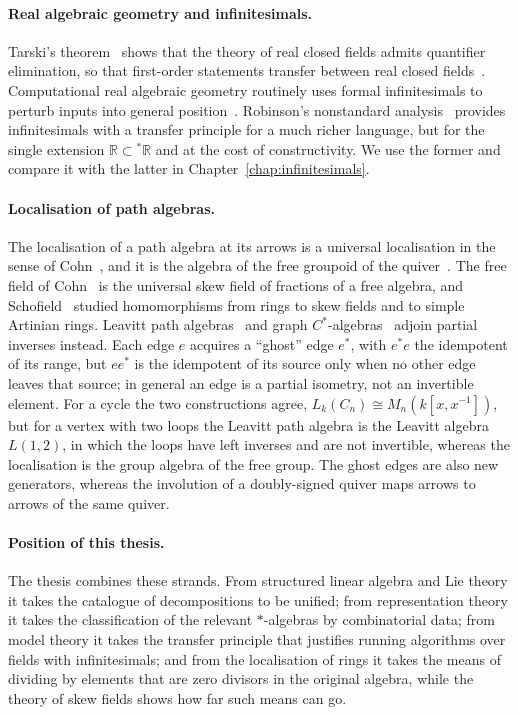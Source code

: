 \documentclass[12pt, a4paper]{report}
\theoremstyle{plain}
\theoremstyle{definition}
\theoremstyle{remark}
\theoremstyle{plain}
\newcommand{\RR}{\mathbb{R}}
\begin{document}
\paragraph{Real algebraic geometry and infinitesimals.}
Tarski's theorem~\cite{Tarski1951} shows that the theory of real closed fields admits quantifier elimination, so that first-order statements transfer between real closed fields~\cite{BochnakCosteRoy1998,Marker2002}. Computational real algebraic geometry routinely uses formal infinitesimals to perturb inputs into general position~\cite{BasuPollackRoy2006}. Robinson's nonstandard analysis~\cite{Robinson1966} provides infinitesimals with a transfer principle for a much richer language, but for the single extension $\RR\subset{}^*\RR$ and at the cost of constructivity. We use the former and compare it with the latter in Chapter~\ref{chap:infinitesimals}.

\paragraph{Localisation of path algebras.}
The localisation of a path algebra at its arrows is a universal localisation in the sense of Cohn~\cite{Cohn2006}, and it is the algebra of the free groupoid of the quiver~\cite{GabrielZisman1967}. The free field of Cohn~\cite{Cohn2006,CohnReutenauer1999} is the universal skew field of fractions of a free algebra, and Schofield~\cite{Schofield1985} studied homomorphisms from rings to skew fields and to simple Artinian rings. Leavitt path algebras~\cite{AbramsAraSilesMolina2017} and graph $C^*$-algebras~\cite{Raeburn2005} adjoin partial inverses instead. Each edge $e$ acquires a ``ghost'' edge $e^*$, with $e^*e$ the idempotent of its range, but $ee^*$ is the idempotent of its source only when no other edge leaves that source; in general an edge is a partial isometry, not an invertible element. For a cycle the two constructions agree, $L_k(C_n)\cong M_n(k[x,x^{-1}])$, but for a vertex with two loops the Leavitt path algebra is the Leavitt algebra $L(1,2)$, in which the loops have left inverses and are not invertible, whereas the localisation is the group algebra of the free group. The ghost edges are also new generators, whereas the involution of a doubly-signed quiver maps arrows to arrows of the same quiver.

\paragraph{Position of this thesis.}
The thesis combines these strands. From structured linear algebra and Lie theory it takes the catalogue of decompositions to be unified; from representation theory it takes the classification of the relevant $*$-algebras by combinatorial data; from model theory it takes the transfer principle that justifies running algorithms over fields with infinitesimals; and from the localisation of rings it takes the means of dividing by elements that are zero divisors in the original algebra, while the theory of skew fields shows how far such means can go.
\end{document}
